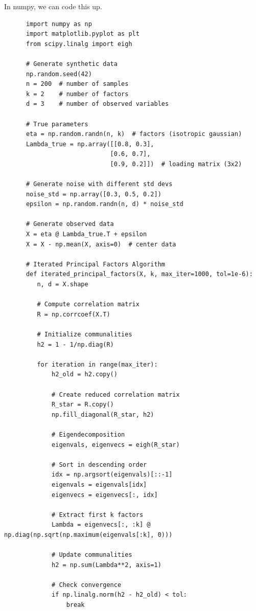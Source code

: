   \begin{example}
    In numpy, we can code this up. 

    \begin{lstlisting}
      import numpy as np
      import matplotlib.pyplot as plt
      from scipy.linalg import eigh

      # Generate synthetic data
      np.random.seed(42)
      n = 200  # number of samples
      k = 2    # number of factors
      d = 3    # number of observed variables

      # True parameters
      eta = np.random.randn(n, k)  # factors (isotropic gaussian)
      Lambda_true = np.array([[0.8, 0.3],
                             [0.6, 0.7], 
                             [0.9, 0.2]])  # loading matrix (3x2)

      # Generate noise with different std devs
      noise_std = np.array([0.3, 0.5, 0.2])
      epsilon = np.random.randn(n, d) * noise_std

      # Generate observed data
      X = eta @ Lambda_true.T + epsilon
      X = X - np.mean(X, axis=0)  # center data

      # Iterated Principal Factors Algorithm
      def iterated_principal_factors(X, k, max_iter=1000, tol=1e-6):
         n, d = X.shape
         
         # Compute correlation matrix
         R = np.corrcoef(X.T)
         
         # Initialize communalities
         h2 = 1 - 1/np.diag(R)
         
         for iteration in range(max_iter):
             h2_old = h2.copy()
             
             # Create reduced correlation matrix
             R_star = R.copy()
             np.fill_diagonal(R_star, h2)
             
             # Eigendecomposition
             eigenvals, eigenvecs = eigh(R_star)
             
             # Sort in descending order
             idx = np.argsort(eigenvals)[::-1]
             eigenvals = eigenvals[idx]
             eigenvecs = eigenvecs[:, idx]
             
             # Extract first k factors
             Lambda = eigenvecs[:, :k] @ np.diag(np.sqrt(np.maximum(eigenvals[:k], 0)))
             
             # Update communalities
             h2 = np.sum(Lambda**2, axis=1)
             
             # Check convergence
             if np.linalg.norm(h2 - h2_old) < tol:
                 break
         

\end{lstlisting}
\end{example}
